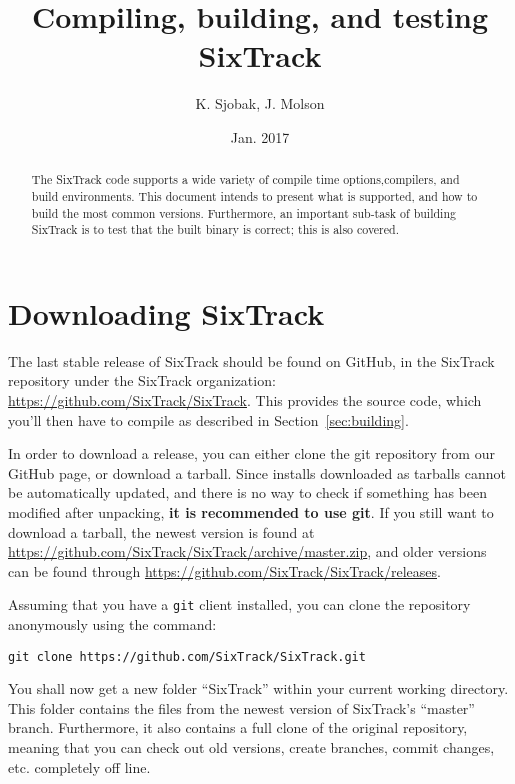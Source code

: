 \documentclass[english,BCOR=0mm,DIV=18]{scrartcl}
\begin{document}
\raggedbottom

\author{K. Sjobak, J. Molson}
\title{Compiling, building, and testing SixTrack}
\date{Jan. 2017}

\maketitle

\begin{abstract}
  The SixTrack code supports a wide variety of compile time options,compilers, and build environments.
  This document intends to present what is supported, and how to build the most common versions.
  Furthermore, an important sub-task of building SixTrack is to test that the built binary is correct; this is also covered.
\end{abstract}

\tableofcontents
\newpage

\section{Downloading SixTrack}
The last stable release of SixTrack should be found on GitHub, in the SixTrack repository under the SixTrack organization:
\url{https://github.com/SixTrack/SixTrack}.
This provides the source code, which you'll then have to compile as described in Section~\ref{sec:building}.

In order to download a release, you can either clone the git repository from our GitHub page, or download a tarball.
Since installs downloaded as tarballs cannot be automatically updated, and there is no way to check if something has been modified after unpacking, \textbf{it is recommended to use git}.
If you still want to download a tarball, the newest version is found at\\
\url{https://github.com/SixTrack/SixTrack/archive/master.zip}, and older versions can be found through
\url{https://github.com/SixTrack/SixTrack/releases}.

Assuming that you have a \texttt{git} client installed, you can clone the repository anonymously using the command:\\
\begin{lstlisting}
git clone https://github.com/SixTrack/SixTrack.git
\end{lstlisting}
You shall now get a new folder ``SixTrack'' within your current working directory.
This folder contains the files from the newest version of SixTrack's ``master'' branch.
Furthermore, it also contains a full clone of the original repository, meaning that you can check out old versions, create branches, commit changes, etc. completely off line.
\end{document}
